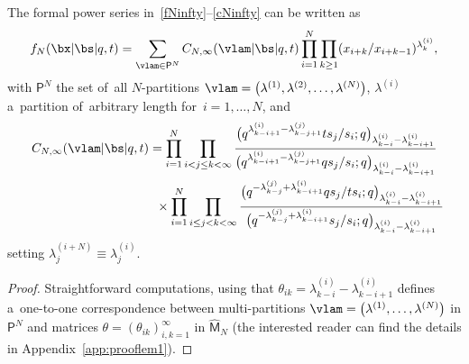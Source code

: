 \begin{Lemma}
\label{lem1}
The formal power series in~\eqref{fNinfty}--\eqref{cNinfty} can be written as
\begin{gather}
\label{fNinfty1}
 f_N(\bx|\bs|q,t) = \sum_{\vlam\in\mathsf{P}^N} C_{N,\infty}(\vlam|\bs|q,t) \prod_{i=1}^N\prod_{k\geq 1}(x_{i+k}/x_{i+k-1})^{\lambda^{(i)}_k},
\end{gather}
with $\mathsf{P}^N$ the set of~all $N$-partitions $\vlam=\big(\lambda^{(1)},\lambda^{(2)},\dots,\lambda^{(N)}\big)$, $\lambda^{(i)}$ a~partition of~arbitrary length for~$i=1,\dots,N$, and
\begin{gather}
C_{N,\infty}(\vlam|\bs|q,t) =
\prod_{i=1}^N \prod_{i< j\leq k< \infty}
\frac{\big(q^{\lambda^{(i)}_{k-i+1} - \lambda^{(j)}_{k-j+1}}ts_{j}/s_i;q\big)_{\lambda^{(i)}_{k-i}-\lambda^{(i)}_{k-i+1}}}{\big(q^{\lambda^{(i)}_{k-i+1} - \lambda^{(j)}_{k-j+1}}qs_{j}/s_i;q\big)_{\lambda^{(i)}_{k-i}-\lambda^{(i)}_{k-i+1}}} \nonumber
\\ \hphantom{C_{N,\infty}(\vlam|\bs|q,t) = }
{} \times \prod_{i=1}^N \prod_{i\leq j<k<\infty}
\frac{\big(q^{-\lambda^{(j)}_{k-j}+\lambda^{(i)}_{k-i+1}}qs_{j}/ts_i ;q\big)_{\lambda^{(i)}_{k-i}-\lambda^{(i)}_{k-i+1}}}{\big(q^{-\lambda^{(j)}_{k-j}+\lambda^{(i)}_{k-i+1}}s_{j}/s_i ;q\big)_{\lambda^{(i)}_{k-i}-\lambda^{(i)}_{k-i+1}}}\label{CNinfty}
\end{gather}
setting $\lambda^{(i+N)}_j \equiv \lambda^{(i)}_j$.
\end{Lemma}
\begin{proof}
Straightforward computations, using that $\theta_{ik} = \lambda^{(i)}_{k-i}-\lambda^{(i)}_{k-i+1}$ defines a~one-to-one correspondence between multi-partitions $\vlam=\big(\lambda^{(1)},\dots,\lambda^{(N)}\big)$ in $\mathsf{P}^N$ and matrices $\theta=(\theta_{ik})_{i,k=1}^\infty$ in $\hat{\mathsf{M}}_N$ (the interested reader can find the details in Appendix~\ref{app:prooflem1}).
\end{proof}
